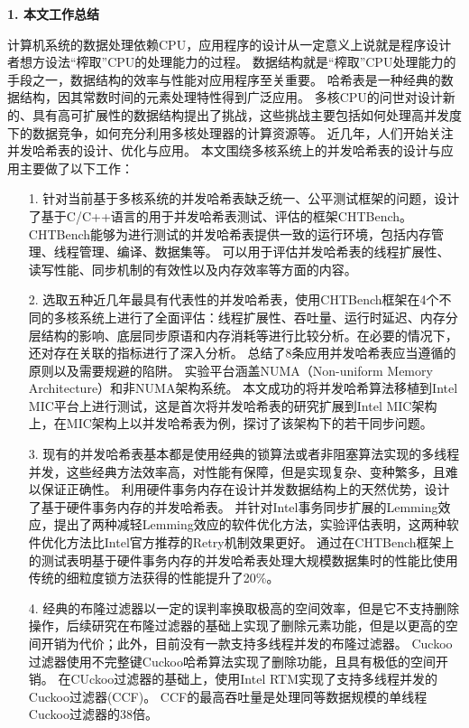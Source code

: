 \begin{summary}
\textbf{1. 本文工作总结}

计算机系统的数据处理依赖CPU，应用程序的设计从一定意义上说就是程序设计者想方设法“榨取”CPU的处理能力的过程。
数据结构就是“榨取”CPU处理能力的手段之一，数据结构的效率与性能对应用程序至关重要。
哈希表是一种经典的数据结构，因其常数时间的元素处理特性得到广泛应用。
多核CPU的问世对设计新的、具有高可扩展性的数据结构提出了挑战，这些挑战主要包括如何处理高并发度下的数据竞争，如何充分利用多核处理器的计算资源等。
近几年，人们开始关注并发哈希表的设计、优化与应用。
本文围绕多核系统上的并发哈希表的设计与应用主要做了以下工作：
\begin{itemize}
	\item[1.] 针对当前基于多核系统的并发哈希表缺乏统一、公平测试框架的问题，设计了基于C/C++语言的用于并发哈希表测试、评估的框架CHTBench。
	CHTBench能够为进行测试的并发哈希表提供一致的运行环境，包括内存管理、线程管理、编译、数据集等。
	可以用于评估并发哈希表的线程扩展性、读写性能、同步机制的有效性以及内存效率等方面的内容。
	\item[2.] 选取五种近几年最具有代表性的并发哈希表，使用CHTBench框架在4个不同的多核系统上进行了全面评估：线程扩展性、吞吐量、运行时延迟、内存分层结构的影响、底层同步原语和内存消耗等进行比较分析。在必要的情况下，还对存在关联的指标进行了深入分析。
	总结了8条应用并发哈希表应当遵循的原则以及需要规避的陷阱。
	实验平台涵盖NUMA（Non-uniform Memory Architecture）和非NUMA架构系统。
	本文成功的将并发哈希算法移植到Intel MIC平台上进行测试，这是首次将并发哈希表的研究扩展到Intel MIC架构上，在MIC架构上以并发哈希表为例，探讨了该架构下的若干同步问题。
	\item[3.] 现有的并发哈希表基本都是使用经典的锁算法或者非阻塞算法实现的多线程并发，这些经典方法效率高，对性能有保障，但是实现复杂、变种繁多，且难以保证正确性。
	利用硬件事务内存在设计并发数据结构上的天然优势，设计了基于硬件事务内存的并发哈希表。
	并针对Intel事务同步扩展的Lemming效应，提出了两种减轻Lemming效应的软件优化方法，实验评估表明，这两种软件优化方法比Intel官方推荐的Retry机制效果更好。
	通过在CHTBench框架上的测试表明基于硬件事务内存的并发哈希表处理大规模数据集时的性能比使用传统的细粒度锁方法获得的性能提升了20\%。
	\item[4.] 经典的布隆过滤器以一定的误判率换取极高的空间效率，但是它不支持删除操作，后续研究在布隆过滤器的基础上实现了删除元素功能，但是以更高的空间开销为代价；此外，目前没有一款支持多线程并发的布隆过滤器。
	Cuckoo过滤器使用不完整键Cuckoo哈希算法实现了删除功能，且具有极低的空间开销。
	在CUckoo过滤器的基础上，使用Intel RTM实现了支持多线程并发的Cuckoo过滤器(CCF)。
	CCF的最高吞吐量是处理同等数据规模的单线程Cuckoo过滤器的38倍。
\end{itemize}


\end{summary}
